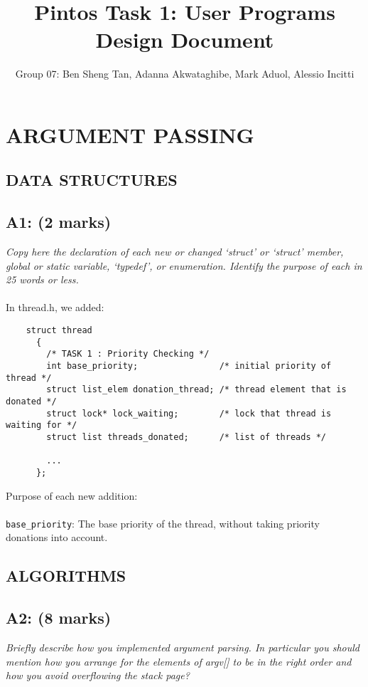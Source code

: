 \documentclass[a4paper,12pt]{article}
\title{Pintos Task 1: User Programs Design Document}
\author{Group 07: Ben Sheng Tan, Adanna Akwataghibe, Mark Aduol, Alessio Incitti }
\begin{document}
\maketitle

\section{ARGUMENT PASSING}

\subsection{ DATA STRUCTURES}

\subsection*{A1: (2 marks) }

\textit{Copy here the declaration of each new or changed ‘struct’ or ‘struct’ member, global or static variable, ‘typedef’, or enumeration. Identify the purpose of each in 25 words or less.}
\\ \\
In thread.h, we added:
\begin{lstlisting}
    struct thread
      {
        /* TASK 1 : Priority Checking */
        int base_priority;                /* initial priority of thread */
        struct list_elem donation_thread; /* thread element that is donated */
        struct lock* lock_waiting;        /* lock that thread is waiting for */
        struct list threads_donated;      /* list of threads */

        ...
      };

\end{lstlisting}

Purpose of each new addition:
\\ \\
\texttt{base\_priority}: The base priority of the thread, without taking priority donations into account.


\subsection{ALGORITHMS}

\subsection*{A2: (8 marks) }

\textit{Briefly describe how you implemented argument parsing. In particular you
should mention how you arrange for the elements of argv[] to be in the right
order and how you avoid overflowing the stack page?}
\end{document}
